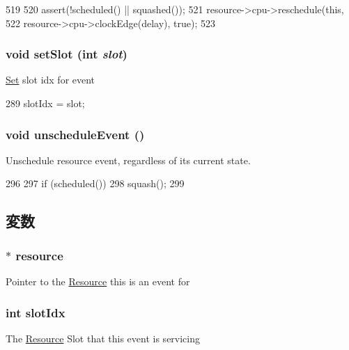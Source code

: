 \begin{DoxyCode}
519 {
520     assert(!scheduled() || squashed());
521     resource->cpu->reschedule(this,
522                               resource->cpu->clockEdge(delay), true);
523 }
\end{DoxyCode}
\hypertarget{classResourceEvent_ad48b0bd4f7e8bd7723ea364a02f69f1f}{
\subsubsection[{setSlot}]{\setlength{\rightskip}{0pt plus 5cm}void setSlot (int {\em slot})}}
\label{classResourceEvent_ad48b0bd4f7e8bd7723ea364a02f69f1f}
\hyperlink{classSet}{Set} slot idx for event 


\begin{DoxyCode}
289 { slotIdx = slot; }
\end{DoxyCode}
\hypertarget{classResourceEvent_a8521a64adc8d310754330bc7dfe48831}{
\subsubsection[{unscheduleEvent}]{\setlength{\rightskip}{0pt plus 5cm}void unscheduleEvent ()}}
\label{classResourceEvent_a8521a64adc8d310754330bc7dfe48831}
Unschedule resource event, regardless of its current state. 


\begin{DoxyCode}
296     {
297         if (scheduled())
298             squash();
299     }
\end{DoxyCode}


\subsection{変数}
\hypertarget{classResourceEvent_aff139c0e9f09dded86c2ed5be8e0bace}{
\subsubsection[{resource}]{$\ast$ {\bf resource}}}
\label{classResourceEvent_aff139c0e9f09dded86c2ed5be8e0bace}
Pointer to the \hyperlink{classResource}{Resource} this is an event for \hypertarget{classResourceEvent_a5a79aee1f5a2cb398bf8b968dbc90cd9}{
\subsubsection[{slotIdx}]{\setlength{\rightskip}{0pt plus 5cm}int {\bf slotIdx}}}
\label{classResourceEvent_a5a79aee1f5a2cb398bf8b968dbc90cd9}
The \hyperlink{classResource}{Resource} Slot that this event is servicing 

